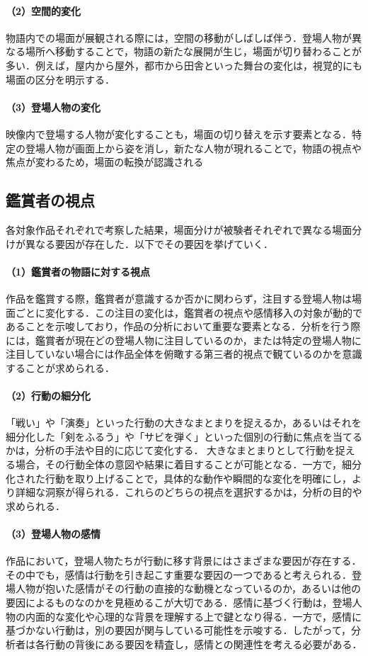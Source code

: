 \paragraph*{（2）空間的変化}
物語内での場面が展観される際には，空間の移動がしばしば伴う．登場人物が異なる場所へ移動することで，物語の新たな展開が生じ，場面が切り替わることが多い．例えば，屋内から屋外，都市から田舎といった舞台の変化は，視覚的にも場面の区分を明示する．

\paragraph*{（3）登場人物の変化}
映像内で登場する人物が変化することも，場面の切り替えを示す要素となる．特定の登場人物が画面上から姿を消し，新たな人物が現れることで，物語の視点や焦点が変わるため，場面の転換が認識される

\subsection{鑑賞者の視点}
各対象作品それぞれで考察した結果，場面分けが被験者それぞれで異なる場面分けが異なる要因が存在した．以下でその要因を挙げていく．

\paragraph*{（1）鑑賞者の物語に対する視点}
作品を鑑賞する際，鑑賞者が意識するか否かに関わらず，注目する登場人物は場面ごとに変化する．この注目の変化は，鑑賞者の視点や感情移入の対象が動的であることを示唆しており，作品の分析において重要な要素となる．分析を行う際には，鑑賞者が現在どの登場人物に注目しているのか，または特定の登場人物に注目していない場合には作品全体を俯瞰する第三者的視点で観ているのかを意識することが求められる．

\paragraph*{（2）行動の細分化}
「戦い」や「演奏」といった行動の大きなまとまりを捉えるか，あるいはそれを細分化した「剣をふるう」や「サビを弾く」といった個別の行動に焦点を当てるかは，分析の手法や目的に応じて変化する． 大きなまとまりとして行動を捉える場合，その行動全体の意図や結果に着目することが可能となる．一方で，細分化された行動を取り上げることで，具体的な動作や瞬間的な変化を明確にし，より詳細な洞察が得られる．これらのどちらの視点を選択するかは，分析の目的や求められる．

\paragraph*{（3）登場人物の感情}
作品において，登場人物たちが行動に移す背景にはさまざまな要因が存在する．その中でも，感情は行動を引き起こす重要な要因の一つであると考えられる．登場人物が抱いた感情がその行動の直接的な動機となっているのか，あるいは他の要因によるものなのかを見極めるこが大切である．感情に基づく行動は，登場人物の内面的な変化や心理的な背景を理解する上で鍵となり得る．一方で，感情に基づかない行動は，別の要因が関与している可能性を示唆する．したがって，分析者は各行動の背後にある要因を精査し，感情との関連性を考える必要がある．

